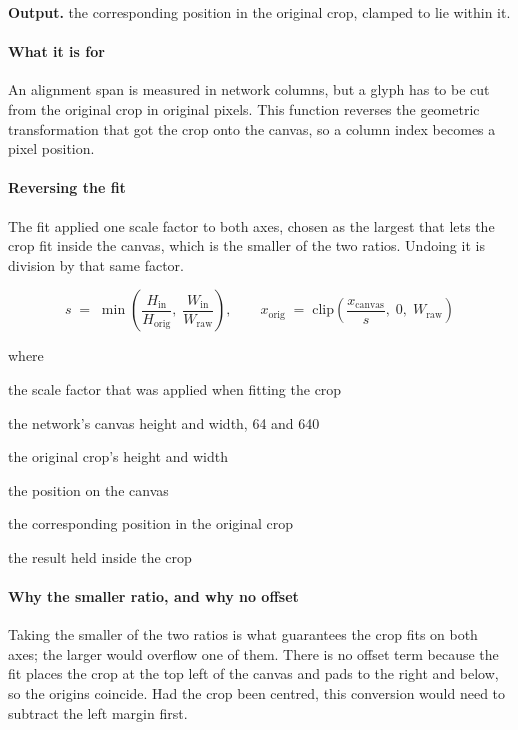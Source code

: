 \noindent\textbf{Output.} the corresponding position in the original crop, clamped to lie within it.


\paragraph{What it is for}
An alignment span is measured in network columns, but a glyph has to be cut from the original crop in original pixels. This function reverses the geometric transformation that got the crop onto the canvas, so a column index becomes a pixel position.


\paragraph{Reversing the fit}
The fit applied one scale factor to both axes, chosen as the largest that lets the crop fit inside the canvas, which is the smaller of the two ratios. Undoing it is division by that same factor.


\begin{equation}
s \;=\; \min\!\left( \frac{H_{\mathrm{in}}}{H_{\mathrm{orig}}},\; \frac{W_{\mathrm{in}}}{W_{\mathrm{raw}}} \right), \qquad x_{\mathrm{orig}} \;=\; \mathrm{clip}\!\left( \frac{x_{\mathrm{canvas}}}{s},\; 0,\; W_{\mathrm{raw}} \right)
\end{equation}

\noindent where
\begin{description}[leftmargin=2.4em,style=nextline,font=\normalfont\ttfamily]\setlength\itemsep{1pt}
  \item[{$s$}] \normalfont the scale factor that was applied when fitting the crop
  \item[{$H_{\mathrm{in}},\, W_{\mathrm{in}}$}] \normalfont the network's canvas height and width, 64 and 640
  \item[{$H_{\mathrm{orig}},\, W_{\mathrm{raw}}$}] \normalfont the original crop's height and width
  \item[{$x_{\mathrm{canvas}}$}] \normalfont the position on the canvas
  \item[{$x_{\mathrm{orig}}$}] \normalfont the corresponding position in the original crop
  \item[{$\mathrm{clip}(\cdot,0,W_{\mathrm{raw}})$}] \normalfont the result held inside the crop
\end{description}

\paragraph{Why the smaller ratio, and why no offset}
Taking the smaller of the two ratios is what guarantees the crop fits on both axes; the larger would overflow one of them. There is no offset term because the fit places the crop at the top left of the canvas and pads to the right and below, so the origins coincide. Had the crop been centred, this conversion would need to subtract the left margin first.



